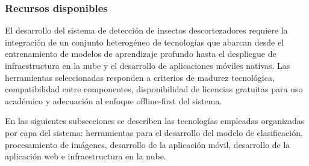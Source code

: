 \newpage
\subsubsection{Recursos disponibles}
El desarrollo del sistema de detección de insectos descortezadores
requiere la integración de un conjunto heterogéneo de tecnologías
que abarcan desde el entrenamiento de modelos de aprendizaje profundo
hasta el despliegue de infraestructura en la nube y el desarrollo de
aplicaciones móviles nativas. Las herramientas seleccionadas responden
a criterios de madurez tecnológica, compatibilidad entre componentes,
disponibilidad de licencias gratuitas para uso académico y adecuación
al enfoque offline-first del sistema.

En las siguientes subsecciones se describen las tecnologías empleadas
organizadas por capa del sistema: herramientas para el desarrollo del
modelo de clasificación, procesamiento de imágenes, desarrollo de la
aplicación móvil, desarrollo de la aplicación web e infraestructura
en la nube.